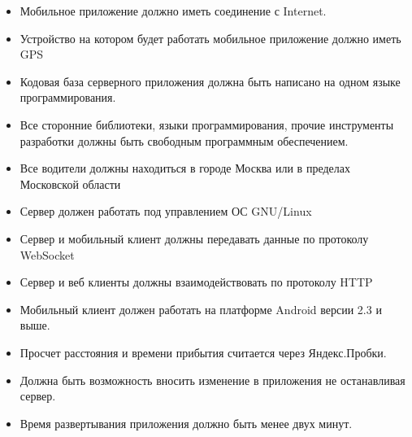 		\begin{itemize}
		\item Мобильное приложение должно иметь соединение с Internet.
		\item Устройство на котором будет работать мобильное приложение должно иметь GPS
		\item Кодовая база серверного приложения должна быть написано на одном языке программирования.
		\item Все сторонние библиотеки, языки программирования, прочие инструменты разработки должны быть свободным программным обеспечением.
		\item Все водители должны находиться в городе Москва или в пределах Московской области
		\item Сервер должен работать под управлением ОС GNU/Linux 
		\item Сервер и мобильный клиент должны передавать данные по протоколу WebSocket
		\item Сервер и веб клиенты должны взаимодействовать по протоколу HTTP
		\item Мобильный клиент должен работать на платформе Android версии 2.3 и выше.
		\item Просчет расстояния и времени прибытия считается через Яндекс.Пробки. 
		\item Должна быть возможность вносить изменение в приложения не останавливая сервер.
		\item Время развертывания приложения должно быть менее двух минут.
		\end{itemize}

		
